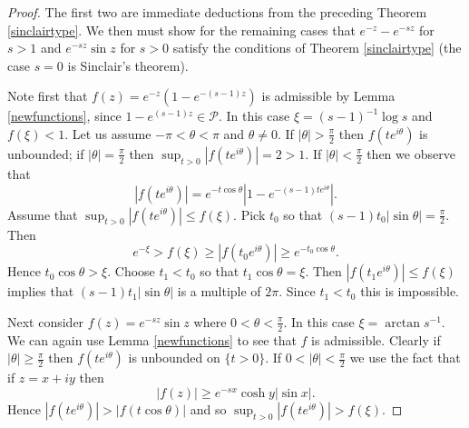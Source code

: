 \documentclass[12pt]{amsart}
\begin{document}
\begin{proof} The first two are immediate deductions from the
preceding Theorem \ref{sinclairtype}. We then must show for the
remaining cases that $e^{-z}-e^{-sz}$ for $s>1$ and
$e^{-sz}\sin{z}$ for $s>0$ satisfy the conditions of Theorem
\ref{sinclairtype} (the case $s=0$ is Sinclair's theorem).

Note first that $f(z)=e^{-z}(1-e^{-(s-1)z})$ is admissible by
Lemma \ref{newfunctions}, since $1-e^{(s-1)z}\in\mathcal P$.  In
this case $\xi=(s-1)^{-1}\log s$ and $f(\xi)<1$.  Let us assume
$-\pi<\theta<\pi$ and $\theta\neq 0$.  If $|\theta|>\frac{\pi}2$
then $f(te^{i\theta})$ is unbounded; if $|\theta|=\frac{\pi}2$
then $\sup_{t>0}|f(te^{i\theta})| = 2>1$. If
$|\theta|<\frac{\pi}2$ then we observe that
$$ |f(te^{i\theta})| =
e^{-t\cos\theta}|1-e^{-(s-1)te^{i\theta}}|.$$ Assume that
$\sup_{t>0}|f(te^{i\theta})|\le f(\xi)$. Pick $t_0$ so that
$(s-1)t_0|\sin\theta|=\frac{\pi}2$. Then
$$ e^{-\xi} > f(\xi)\ge |f(t_0e^{i\theta})|\ge e^{-t_0\cos\theta}.$$  Hence
$ t_0\cos\theta>\xi$.  Choose $t_1<t_0$ so that
$t_1\cos\theta=\xi$.  Then $|f(t_1e^{i\theta})|\le f(\xi)$ implies
that $(s-1)t_1|\sin\theta|$ is a multiple of $2\pi$.  Since
$t_1<t_0$ this is impossible.

Next consider $f(z)=e^{-sz}\sin{z}$ where $0<\theta<\frac{\pi}2$.
In this case $\xi=\arctan s^{-1}$.  We can again use Lemma
\ref{newfunctions} to see that $f$ is admissible. Clearly if
$|\theta|\ge\frac{\pi}2$ then $f(te^{i\theta})$ is unbounded on
$\{t>0\}$.  If $0<|\theta|<\frac{\pi}2$ we use the fact that if
$z=x+iy$ then $$ |f(z)|\ge e^{-sx}\cosh y|\sin x|.$$ Hence $
|f(te^{i\theta})|> |f(t\cos\theta)|$ and so
$\sup_{t>0}|f(te^{i\theta})|>f(\xi)$.\end{proof}
\end{document}
